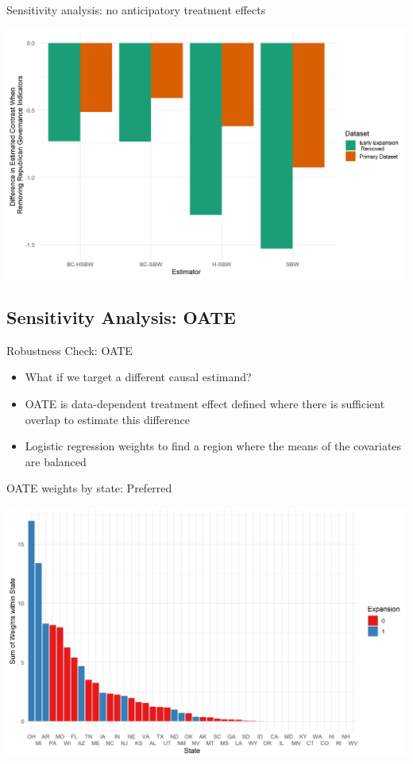 \documentclass[hyperref={pdfpagelabels=false}]{beamer}
\begin{document}
\begin{frame}{Sensitivity analysis: no anticipatory treatment effects}
    \begin{center}
	\includegraphics[scale=0.5]{01_Plots/repub-diff-c1c2.png}
    \end{center}
\end{frame}

\subsection{Sensitivity Analysis: OATE}

\begin{frame}{Robustness Check: OATE}
    \begin{itemize}
        \item What if we target a different causal estimand? \bigskip
        \item OATE is data-dependent treatment effect defined where there is sufficient overlap to estimate this difference \bigskip
        \item Logistic regression weights to find a region where the means of the covariates are balanced \bigskip
    \end{itemize}
\end{frame}

\begin{frame}{OATE weights by state: Preferred}
    \begin{center}
	\includegraphics[scale=0.5]{01_Plots/oate-region-c1-a.png}
    \end{center}
\end{frame}
\end{document}
